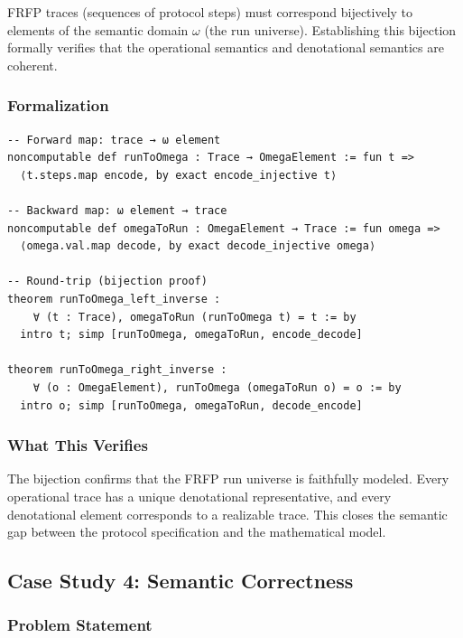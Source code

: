 FRFP traces (sequences of protocol steps) must correspond bijectively to elements
of the semantic domain $\omega$ (the run universe). Establishing this bijection
formally verifies that the operational semantics and denotational semantics are
coherent.

\subsubsection*{Formalization}

\begin{lstlisting}
-- Forward map: trace → ω element
noncomputable def runToOmega : Trace → OmegaElement := fun t =>
  ⟨t.steps.map encode, by exact encode_injective t⟩

-- Backward map: ω element → trace
noncomputable def omegaToRun : OmegaElement → Trace := fun omega =>
  ⟨omega.val.map decode, by exact decode_injective omega⟩

-- Round-trip (bijection proof)
theorem runToOmega_left_inverse :
    ∀ (t : Trace), omegaToRun (runToOmega t) = t := by
  intro t; simp [runToOmega, omegaToRun, encode_decode]

theorem runToOmega_right_inverse :
    ∀ (o : OmegaElement), runToOmega (omegaToRun o) = o := by
  intro o; simp [runToOmega, omegaToRun, decode_encode]
\end{lstlisting}

\subsubsection*{What This Verifies}

The bijection confirms that the FRFP run universe is faithfully modeled. Every
operational trace has a unique denotational representative, and every denotational
element corresponds to a realizable trace. This closes the semantic gap between
the protocol specification and the mathematical model.

\subsection{Case Study 4: Semantic Correctness}


\subsubsection*{Problem Statement}

